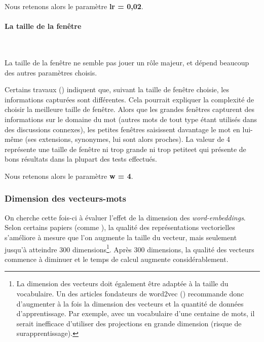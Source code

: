 \documentclass[11pt,french,french]{article}
\let\rmarkdownfootnote\footnote%
\def\footnote{\protect\rmarkdownfootnote}
\begin{document}
\faArrowCircleRight{} Nous retenons alors le paramètre \textbf{lr =
0,02}.

\paragraph{La taille de la fenêtre}\label{la-taille-de-la-fenuxeatre}

~

La taille de la fenêtre ne semble pas jouer un rôle majeur, et dépend
beaucoup des autres paramètres choisis.

Certains travaux (\cite{Levy2}) indiquent que, suivant la taille de
fenêtre choisie, les informations capturées sont différentes. Cela
pourrait expliquer la complexité de choisir la \og meilleure \fg taille
de fenêtre. Alors que les \og grandes \fg fenêtres capturent des
informations sur le domaine du mot (autres mots de tout type étant
utilisés dans des discussions connexes), les \og petites \fg fenêtres
saisissent davantage le mot en lui-même (ses extensions, synonymes, lui
sont alors proches). La valeur de 4 représente une taille de fenêtre
\og ni trop grande ni trop petite\fg et qui présente de bons résultats
dans la plupart des tests effectués.

\faArrowCircleRight{} Nous retenons alors le paramètre \textbf{w = 4}.

\subsubsection{Dimension des
vecteurs-mots}\label{dimension-des-vecteurs-mots}

On cherche cette fois-ci à évaluer l'effet de la dimension des
\emph{word-embeddings}. Selon certains papiers (comme
\cite{Pennington}), la qualité des représentations vectorielles
s'améliore à mesure que l'on augmente la taille du vecteur, mais
seulement jusqu'à atteindre 300 dimensions\footnote{La dimension des
  vecteurs doit également être adaptée à la taille du vocabulaire. Un
  des articles fondateurs de word2vec (\cite{Mikolov}) recommande donc
  d'augmenter à la fois la dimension des vecteurs et la quantité de
  données d'apprentissage. Par exemple, avec un vocabulaire d'une
  centaine de mots, il serait inefficace d'utiliser des projections en
  grande dimension (risque de surapprentissage).}. Après 300 dimensions,
la qualité des vecteurs commence à diminuer et le temps de calcul
augmente considérablement.
\end{document}
